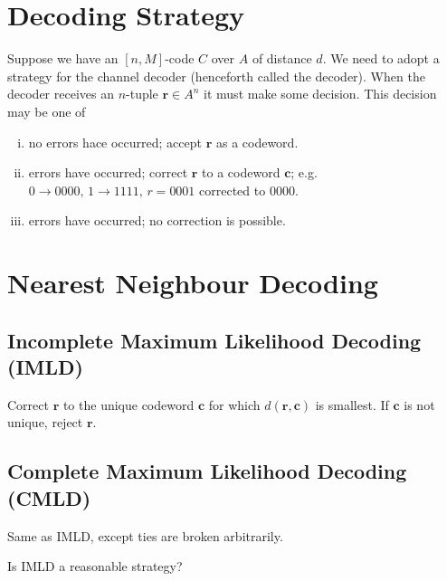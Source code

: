 
\section{Decoding Strategy}
Suppose we have an $ [n,M] $-code $ C $ over $ A $ of distance $ d $.
We need to adopt a strategy for the channel decoder (henceforth called the decoder).
When the decoder receives an $ n $-tuple $ \bm{r}\in A^n $ it must make some decision.
This decision may be one of
\begin{enumerate}[(i)]
    \item no errors hace occurred; accept $ \bm{r} $ as a codeword.
    \item errors have occurred; correct $ \bm{r} $ to a codeword $ \bm{c} $;
          e.g. $ 0 \rightarrow 0000,\,1 \rightarrow 1111,\,r=0001 $ corrected to
          $ 0000 $.
    \item errors have occurred; no correction is possible.
\end{enumerate}

\section{Nearest Neighbour Decoding}
\subsection{Incomplete Maximum Likelihood Decoding (IMLD)}
Correct $ \bm{r} $ to the unique codeword $ \bm{c} $ for which
$ d(\bm{r},\bm{c}) $ is smallest.
If $ \bm{c} $ is not unique, reject $ \bm{r} $.
\subsection{Complete Maximum Likelihood Decoding (CMLD)}
Same as IMLD, except ties are broken arbitrarily.

 Is IMLD a reasonable strategy?

